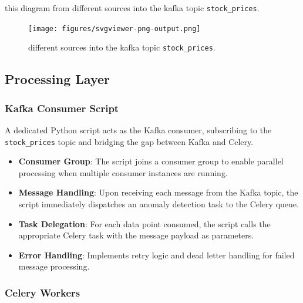 this diagram from different sources into the kafka topic \texttt{stock\_prices}.

\begin{figure}[H]
    
   
    \texttt{[image: figures/svgviewer-png-output.png]}
    \caption{different sources into the kafka topic \texttt{stock\_prices}.}
    \label{fig:data_collection_layer_diagram}


\end{figure}




\subsection{Processing Layer}

\subsubsection{Kafka Consumer Script}

A dedicated Python script acts as the Kafka consumer, subscribing to the \texttt{stock\_prices} topic and bridging the gap between Kafka and Celery.
\begin{itemize}
    \item \textbf{Consumer Group}: The script joins a consumer group to enable parallel processing when multiple consumer instances are running.
    \item \textbf{Message Handling}: Upon receiving each message from the Kafka topic, the script immediately dispatches an anomaly detection task to the Celery queue.
    \item \textbf{Task Delegation}: For each data point consumed, the script calls the appropriate Celery task with the message payload as parameters.
    \item \textbf{Error Handling}: Implements retry logic and dead letter handling for failed message processing.
\end{itemize}

\subsubsection{Celery Workers}

